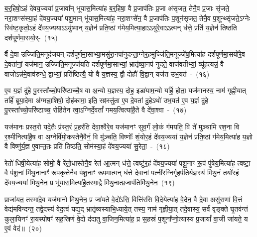 {\anuvakamend[{अ॒न्वा॒हा॒र्ये॑ण प्र॒जा\-प॑तेरसि॒ ह्य॑मुष्मिँ॑ल्लो॒के पञ्च॑दश च}]}%

ब॒र्॒\mbox{}हिषो॒\-ऽहं दे॑वय॒ज्यया᳚ प्र॒जावा᳚न् भूयास॒मित्या॑ह ब॒र्॒\mbox{}हिषा॒ वै प्र॒जा\-प॑तिः प्र॒जा अ॑सृजत॒ तेनै॒व प्र॒जाः सृ॑जते॒ नरा॒शꣳस॑स्या॒हं दे॑वय॒ज्यया॑ पशु॒मान् भू॑यास॒मित्या॑ह॒ नरा॒शꣳसे॑न॒ वै प्र॒जा\-प॑तिः प॒शून॑सृजत॒ तेनै॒व प॒शून्थ्सृ॑जते॒\-ऽग्नेः स्वि॑ष्ट॒कृतो॒\-ऽहं दे॑वय॒ज्यया\-ऽऽ\-यु॑ष्मान् य॒ज्ञेन॑ प्रति॒ष्ठां ग॑मेय॒मित्या॒हा\-ऽऽ\-यु॑रे॒वा\-ऽऽ\-त्मन् ध॑त्ते॒ प्रति॑ य॒ज्ञेन॑ तिष्ठति दर्\mbox{}श\-पूर्ण\-मा॒सयो॒र्-~(१५)

र्वै दे॒वा उज्जि॑ति॒मनूद॑जयन् दर्\mbox{}श\-पूर्ण\-मा॒साभ्या॒मसु॑रा॒नपा॑\-नुदन्ता॒ग्नेर॒ह\-मुज्जि॑ति॒\-मनूज्जे॑ष॒मित्या॑ह दर्\mbox{}श\-पूर्ण\-मा॒सयो॑रे॒व दे॒वता॑नां॒ यज॑मान॒ उज्जि॑ति॒मनूज्ज॑यति दर्\mbox{}श\-पूर्ण\-मा॒साभ्यां॒ भ्रातृ॑व्या॒नप॑ नुदते॒ वाज॑वतीभ्यां॒ व्यू॑ह॒त्यन्नं॒ वै वाजो\-ऽन्न॑मे॒वाव॑\-रुन्धे॒ द्वाभ्यां॒ प्रति॑ष्ठित्यै॒ यो वै य॒ज्ञस्य॒ द्वौ दोहौ॑ वि॒द्वान् यज॑त उभ॒यत॑~-~(१६)

ए॒व य॒ज्ञं दु॑हे पु॒रस्ता᳚च्चो॒परि॑ष्टाच्चै॒ष वा अ॒न्यो य॒ज्ञस्य॒ दोह॒ इडा॑याम॒न्यो यर्\mbox{}हि॒ होता॒ यज॑मानस्य॒ नाम॑ गृह्णी॒यात् तर्\mbox{}हि॑ ब्रूया॒देमा अ॑ग्मन्ना॒शिषो॒ दोह॑कामा॒ इति॒ सꣴस्तु॑ता ए॒व दे॒वता॑ दु॒हे\-ऽथो॑ उभ॒यत॑ ए॒व य॒ज्ञं दु॑हे पु॒रस्ता᳚च्चो॒परि॑ष्टाच्च॒ रोहि॑तेन त्वा॒\-ऽग्निर्दे॒वतां᳚ गमय॒त्वित्या॑है॒ते वै दे॑वा॒श्वा~-~(१७)

यज॑मानः प्रस्त॒रो यदे॒तैः प्र॑स्त॒रं प्र॒हर॑ति देवा॒श्वैरे॒व यज॑मानꣳ सुव॒र्गं लो॒कं ग॑मयति॒ वि ते॑ मुञ्चामि रश॒ना वि र॒श्मीनित्या॑है॒ष वा अ॒ग्नेर्वि॑मो॒कस्तेनै॒वैनं॒ वि मु॑ञ्चति॒ विष्णोः᳚ शं॒योर॒हं दे॑वय॒ज्यया॑ य॒ज्ञेन॑ प्रति॒ष्ठां ग॑मेय॒मित्या॑ह य॒ज्ञो वै विष्णु॑र्य॒ज्ञ ए॒वान्त॒तः प्रति॑ तिष्ठति॒ सोम॑स्या॒हं दे॑वय॒ज्यया॑ सु॒रेता॒~-~(१८)

रेतो॑ धिषी॒येत्या॑ह॒ सोमो॒ वै रे॑तो॒धास्तेनै॒व रेत॑ आ॒त्मन् ध॑त्ते॒ त्वष्टु॑र॒हं दे॑वय॒ज्यया॑ पशू॒नाꣳ रू॒पं पु॑षेय॒मित्या॑ह॒ त्वष्टा॒ वै प॑शू॒नां मि॑थु॒नानाꣳ॑ रूप॒कृत्तेनै॒व प॑शू॒नाꣳ रू॒पमा॒त्मन् ध॑त्ते दे॒वानां॒ पत्नी॑र॒ग्निर्गृ॒हप॑तिर्य॒ज्ञस्य॑ मिथु॒नं तयो॑र॒हं दे॑वय॒ज्यया॑ मिथु॒नेन॒ प्र भू॑यास॒मित्या॑है॒तस्मा॒द्वै मि॑थु॒नात्प्र॒जा\-प॑तिर्मिथु॒नेन॒~(१९)

प्राजा॑यत॒ तस्मा॑दे॒व यज॑मानो मिथु॒नेन॒ प्र जा॑यते वे॒दो॑\-ऽसि॒ वित्ति॑रसि वि॒देयेत्या॑ह वे॒देन॒ वै दे॒वा असु॑राणां वि॒त्तं वेद्य॑मविन्दन्त॒ तद्वे॒दस्य॑ वेद॒त्वं यद्य॒द् भ्रातृ॑व्यस्याभि॒ध्याये॒त् तस्य॒ नाम॑ गृह्णीया॒त् तदे॒वास्य॒ सर्वं॑ वृङ्क्ते घृ॒तव॑न्तं कुला॒यिनꣳ॑ रा॒यस्पोषꣳ॑ सह॒स्रिणं॑ वे॒दो द॑दातु वा॒जिन॒मित्या॑ह॒ प्र स॒हस्रं॑ प॒शूना᳚प्नो॒त्यास्य॑ प्र॒जायां᳚ वा॒जी जा॑यते॒ य ए॒वं वेद॑॥~(२०)

